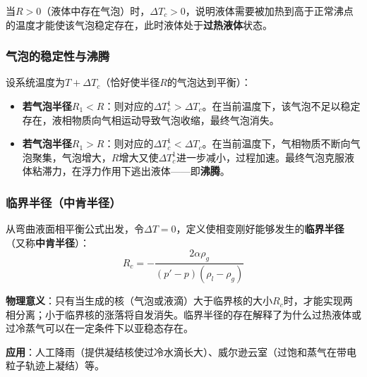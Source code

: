 \documentclass[UTF8]{ctexart}
\theoremstyle{definition}
\begin{document}
当$R>0$（液体中存在气泡）时，$\Delta T_c>0$，说明液体需要被加热到高于正常沸点的温度才能使该气泡稳定存在，此时液体处于\textbf{过热液体}状态。

\subsubsection*{气泡的稳定性与沸腾}

设系统温度为$T+\Delta T_c$（恰好使半径$R$的气泡达到平衡）：

\begin{itemize}
\item \textbf{若气泡半径$R_1<R$}：则对应的$\Delta T_c^1>\Delta T_c$。在当前温度下，该气泡不足以稳定存在，液相物质向气相运动导致气泡收缩，最终气泡消失。
\item \textbf{若气泡半径$R_1>R$}：则对应的$\Delta T_c^1<\Delta T_c$。在当前温度下，气相物质不断向气泡聚集，气泡增大，$R$增大又使$\Delta T_c^1$进一步减小，过程加速。最终气泡克服液体粘滞力，在浮力作用下逃出液体——即\textbf{沸腾}。
\end{itemize}

\subsubsection*{临界半径（中肯半径）}

从弯曲液面相平衡公式出发，令$\Delta T=0$，定义使相变刚好能够发生的\textbf{临界半径}（又称\textbf{中肯半径}）：
\begin{equation}
\boxed{R_c=-\frac{2\alpha\rho_g}{(p'-p)(\rho_l-\rho_g)}}
\end{equation}

\textbf{物理意义}：只有当生成的核（气泡或液滴）大于临界核的大小$R_c$时，才能实现两相分离；小于临界核的涨落将自发消失。临界半径的存在解释了为什么过热液体或过冷蒸气可以在一定条件下以亚稳态存在。

\textbf{应用}：人工降雨（提供凝结核使过冷水滴长大）、威尔逊云室（过饱和蒸气在带电粒子轨迹上凝结）等。
\end{document}
